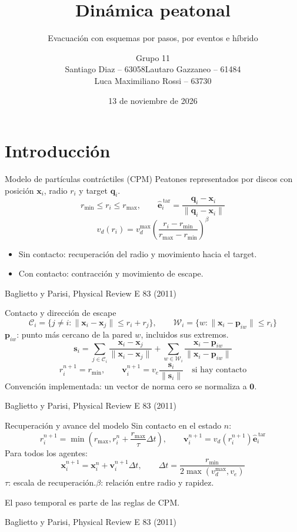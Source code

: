\documentclass[aspectratio=169,20pt]{beamer}
\title{Dinámica peatonal}
\subtitle{Evacuación con esquemas por pasos, por eventos e híbrido}
\author{Grupo 11\\Santiago Diaz -- 63058\quad Lautaro Gazzaneo -- 61484\\Luca Maximiliano Rossi -- 63730}
\institute{Simulación de Sistemas -- ITBA}
\date{13 de noviembre de 2026}
\newcommand{\vb}[1]{\mathbf{#1}}
\newcommand{\citaCPM}{\par\vfill{\fontsize{16}{19}\selectfont Baglietto y Parisi, Physical Review E 83 (2011)}}
\begin{document}
	\begin{frame}\titlepage\end{frame}
	
	\section{Introducción}
	\begin{frame}{Modelo de partículas contráctiles (CPM)}
		Peatones representados por discos con posición $\vb{x}_i$, radio $r_i$ y target $\vb{q}_i$.
		\[
		r_{\min}\le r_i\le r_{\max},\qquad
		\widehat{\vb{e}}_i^{\,\mathrm{tar}}=
		\frac{\vb{q}_i-\vb{x}_i}{\lVert\vb{q}_i-\vb{x}_i\rVert}
		\]
		\[
		v_d(r_i)=v_d^{\max}\left(\frac{r_i-r_{\min}}{r_{\max}-r_{\min}}\right)^\beta
		\]
		\begin{itemize}
			\item Sin contacto: recuperación del radio y movimiento hacia el target.
			\item Con contacto: contracción y movimiento de escape.
		\end{itemize}
		\citaCPM
	\end{frame}
	
	\begin{frame}{Contacto y dirección de escape}
		\[
		\mathcal C_i=\{j\ne i:\lVert\vb{x}_i-\vb{x}_j\rVert\le r_i+r_j\},\qquad
		\mathcal W_i=\{w:\lVert\vb{x}_i-\vb{p}_{iw}\rVert\le r_i\}
		\]
		$\vb{p}_{iw}$: punto más cercano de la pared $w$, incluidos sus extremos.
		\[
		\vb{s}_i=\sum_{j\in\mathcal C_i}\frac{\vb{x}_i-\vb{x}_j}{\lVert\vb{x}_i-\vb{x}_j\rVert}
		+\sum_{w\in\mathcal W_i}\frac{\vb{x}_i-\vb{p}_{iw}}{\lVert\vb{x}_i-\vb{p}_{iw}\rVert}
		\]
		\[
		r_i^{n+1}=r_{\min},\qquad \vb{v}_i^{n+1}=v_e\frac{\vb{s}_i}{\lVert\vb{s}_i\rVert}
		\quad\text{si hay contacto}
		\]
		Convención implementada: un vector de norma cero se normaliza a $\vb{0}$.
		\citaCPM
	\end{frame}
	
	\begin{frame}{Recuperación y avance del modelo}
		Sin contacto en el estado $n$:
		\[
		r_i^{n+1}=\min\left(r_{\max},r_i^n+\frac{r_{\max}}{\tau}\Delta t\right),\qquad
		\vb{v}_i^{n+1}=v_d(r_i^{n+1})\widehat{\vb{e}}_i^{\,\mathrm{tar}}
		\]
		Para todos los agentes:
		\[
		\vb{x}_i^{n+1}=\vb{x}_i^n+\vb{v}_i^{n+1}\Delta t,\qquad
		\Delta t=\frac{r_{\min}}{2\max(v_d^{\max},v_e)}
		\]
		$\tau$: escala de recuperación.\quad $\beta$: relación entre radio y rapidez.
		
		El paso temporal es parte de las reglas de CPM.
		\citaCPM
	\end{frame}
	
\end{document}
